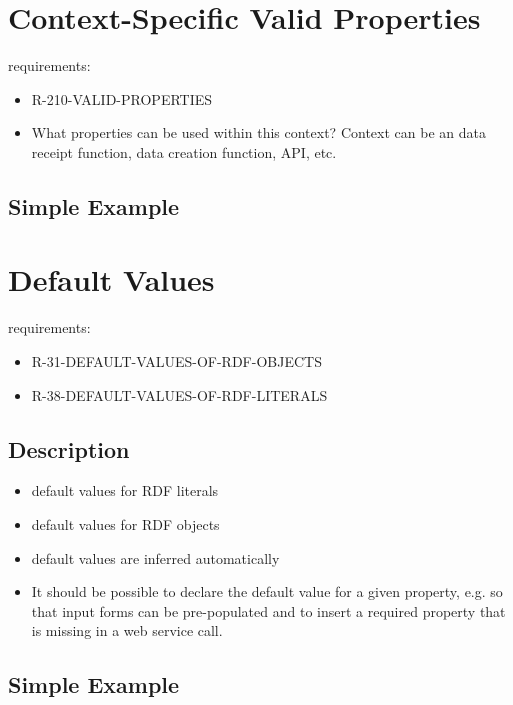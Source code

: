 \documentclass{llncs}
\begin{document}
\section{Context-Specific Valid Properties}

requirements:

\begin{itemize}
	\item R-210-VALID-PROPERTIES
\end{itemize}

\begin{itemize}
	\item What properties can be used within this context? Context can be an data receipt function, data creation function, API, etc.
\end{itemize}

\subsection{Simple Example}



\section{Default Values}

requirements:

\begin{itemize}
	\item R-31-DEFAULT-VALUES-OF-RDF-OBJECTS
  \item R-38-DEFAULT-VALUES-OF-RDF-LITERALS
\end{itemize}

\subsection{Description}

\begin{itemize}
	\item default values for RDF literals
	\item default values for RDF objects
	\item default values are inferred automatically
	\item It should be possible to declare the default value for a given property, e.g. so that input forms can be pre-populated and to insert a required property that is missing in a web service call. 
\end{itemize}

\subsection{Simple Example}
\end{document}
